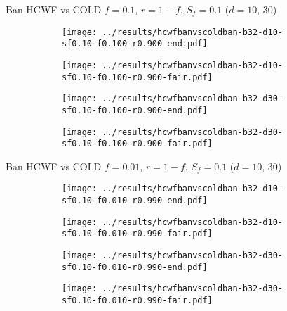 \documentclass[8pt,a4paper]{beamer}
\begin{document}
		\begin{frame}{Ban HCWF vs COLD $f=0.1,\, r=1-f,\,S_f=0.1$  ($d=10,\, 30$)}
			\begin{figure}
				\begin{subfigure}{.48\textwidth}
					\centering
					\texttt{[image: ../results/hcwfbanvscoldban-b32-d10-sf0.10-f0.100-r0.900-end.pdf]}
				\end{subfigure}
				\begin{subfigure}{.48\textwidth}
					\centering
					\texttt{[image: ../results/hcwfbanvscoldban-b32-d10-sf0.10-f0.100-r0.900-fair.pdf]}
				\end{subfigure}
			\end{figure}
			
			\begin{figure}
				\begin{subfigure}{.48\textwidth}
					\centering
					\texttt{[image: ../results/hcwfbanvscoldban-b32-d30-sf0.10-f0.100-r0.900-end.pdf]}
				\end{subfigure}
				\begin{subfigure}{.48\textwidth}
					\centering
					\texttt{[image: ../results/hcwfbanvscoldban-b32-d30-sf0.10-f0.100-r0.900-fair.pdf]}
				\end{subfigure}
			\end{figure}
		\end{frame}
	
		\begin{frame}{Ban HCWF vs COLD $f=0.01,\, r=1-f,\,S_f=0.1$  ($d=10,\, 30$)}
			\begin{figure}
				\begin{subfigure}{.48\textwidth}
					\centering
					\texttt{[image: ../results/hcwfbanvscoldban-b32-d10-sf0.10-f0.010-r0.990-end.pdf]}
				\end{subfigure}
				\begin{subfigure}{.48\textwidth}
					\centering
					\texttt{[image: ../results/hcwfbanvscoldban-b32-d10-sf0.10-f0.010-r0.990-fair.pdf]}
				\end{subfigure}
			\end{figure}
			
			\begin{figure}
				\begin{subfigure}{.48\textwidth}
					\centering
					\texttt{[image: ../results/hcwfbanvscoldban-b32-d30-sf0.10-f0.010-r0.990-end.pdf]}
				\end{subfigure}
				\begin{subfigure}{.48\textwidth}
					\centering
					\texttt{[image: ../results/hcwfbanvscoldban-b32-d30-sf0.10-f0.010-r0.990-fair.pdf]}
				\end{subfigure}
			\end{figure}
		\end{frame}
		
\end{document}
